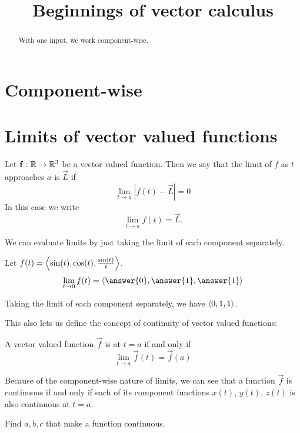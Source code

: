\documentclass{ximera}
\title[Dig-In:]{Beginnings of vector calculus}
\begin{document}
\begin{abstract}
  With one input, we work component-wise.
\end{abstract}
\maketitle

\section{Component-wise}


\section{Limits of vector valued functions}

\begin{definition}
  Let $\mathbf{f}:\mathbb R \to \mathbb R^3$ be a vector valued function.  Then we say
  that the limit of $f$ as $t$ approaches $a$ is $\vec{L}$ if
  \[
  \lim_{t \to a} \left| f(t) - \vec{L}\right| = 0
  \]
  In this case we write
  \[
  \lim_{t \to a} f(t) = \vec{L}.
  \]
\end{definition}

We can evaluate limits by just taking the limit of each component
separately.

\begin{question}
  Let $f(t) = \left\langle \sin(t),\cos(t),\frac{\sin(t)}{t}\right\rangle$.  
  \[
  \lim_{t \to 0} f(t) = \vector{\answer{0},\answer{1},\answer{1}}
  \]
  \begin{hint}
    Taking the limit of each component separately, we have $\left\langle 0,1,1\right\rangle$.
  \end{hint}
\end{question}


This also lets us define the concept of continuity of vector valued functions: 

\begin{definition}
  A vector valued function $\vec{f}$ is  at $t= a$ if
  and only if
  \[
  \lim_{t \to a} \vec{f}(t)  = \vec{f}(a)
  \]
\end{definition}
Because of the component-wise nature of limits, we can see that a
function $\vec{f}$ is continuous if and only if each of its component
functions $x(t)$, $y(t)$, $z(t)$ is also continuous at $t=a$.


Find $a,b,c$ that make a function continuous. 
\end{document}

